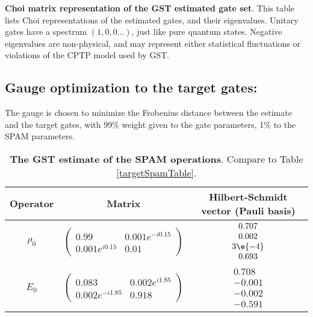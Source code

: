 {\begin{table}[h]
\begin{center}
\caption{\textbf{Choi matrix representation of the GST estimated gate set}.  This table lists Choi representations of the estimated gates, and their eigenvalues.  Unitary gates have a spectrum $(1,0,0\ldots)$, just like pure quantum states.  Negative eigenvalues are non-physical, and may represent either statistical fluctuations or violations of the CPTP model used by GST.\label{bestTargetSpamGatesetChoiTable}}
\end{center}
\end{table}

\clearpage

\subsection{Gauge optimization to the target gates:}
The gauge is chosen to minimize the Frobenius distance between the estimate and the target gates, with 99\% weight given to the gate parameters, 1\% to the SPAM parameters.


\begin{table}[h]
\begin{center}
\begin{tabular}[l]{|c|c|c|}
\hline
Operator & Matrix & Hilbert-Schmidt vector (Pauli basis) \\ \hline
$\rho_{0}$ & $ \left(\!\!\begin{array}{cc}
0.99 & 0.001e^{-i0.15} \\ 
0.001e^{i0.15} & 0.01
 \end{array}\!\!\right) $
 & $ \begin{array}{c}
0.707 \\ 
0.002 \\ 
3\e{-4} \\ 
0.693
 \end{array} $
 \\ \hline
$E_{0}$ & $ \left(\!\!\begin{array}{cc}
0.083 & 0.002e^{i1.85} \\ 
0.002e^{-i1.85} & 0.918
 \end{array}\!\!\right) $
 & $ \begin{array}{c}
0.708 \\ 
-0.001 \\ 
-0.002 \\ 
-0.591
 \end{array} $
 \\ \hline
\end{tabular}

\caption{\textbf{The GST estimate of the SPAM operations}.  Compare to Table \ref{targetSpamTable}.\label{bestTargetGatesGatesetSpamTable}}
\end{center}
\end{table}

}

